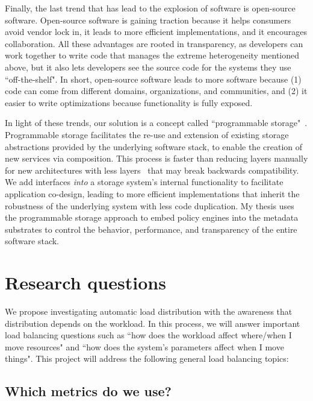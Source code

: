 Finally, the last trend that has lead to the explosion of software is
open-source software. Open-source software is gaining traction because it helps
consumers avoid vendor lock in, it leads to more efficient implementations, and
it encourages collaboration. All these advantages are rooted in transparency,
as developers can work together to write code that manages the extreme
heterogeneity mentioned above, but it also lets developers see the source code
for the systems they use ``off-the-shelf". In short, open-source software leads
to more software because (1) code can come from different domains,
organizations, and communities, and (2) it easier to write optimizations
because functionality is fully exposed.

In light of these trends, our solution is a concept called ``programmable
storage"~\cite{sevilla:eurosys17-malacology, watkins:hot17-declstor}.
Programmable storage facilitates the re-use and extension of existing storage
abstractions provided by the underlying software stack, to enable the creation
of new services via composition. This process is faster than reducing layers
manually for new architectures with less layers~\cite{bent:login16-hpc-trends}
that may break backwards compatibility.  We add interfaces {\it into} a storage
system's internal functionality to facilitate application co-design, leading to
more efficient implementations that inherit the robustness of the underlying
system with less code duplication. My thesis uses the programmable storage
approach to embed policy engines into the metadata substrates to control the
behavior, performance, and transparency of the entire software stack.

\section{Research questions}

We propose investigating automatic load distribution with the awareness that
distribution depends on the workload. In this process, we will answer important
load balancing questions such as ``how does the workload affect where/when I
move resources" and ``how does the system's parameters affect when I move
things". This project will address the following general load balancing topics:

\subsection*{Which metrics do we use?}

